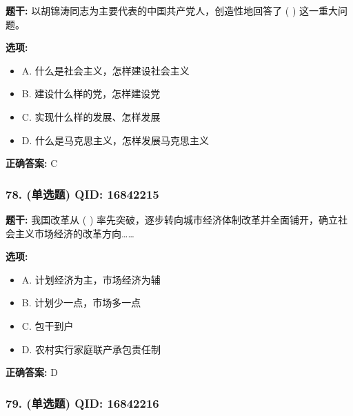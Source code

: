 \documentclass[12pt,UTF8]{ctexart}
\begin{document}
\textbf{题干:}
以胡锦涛同志为主要代表的中国共产党人，创造性地回答了 ( ) 这一重大问题。

\textbf{选项:}
\begin{itemize}[leftmargin=*]

  \item A. 什么是社会主义，怎样建设社会主义

  \item B. 建设什么样的党，怎样建设党

  \item C. 实现什么样的发展、怎样发展

  \item D. 什么是马克思主义，怎样发展马克思主义

\end{itemize}

\textbf{正确答案:}
C

\vspace{0.3em}\hrulefill\vspace{0.7em}

\subsubsection*{78. (单选题) \small QID: 16842215}

\textbf{题干:}
我国改革从 ( ) 率先突破，逐步转向城市经济体制改革并全面铺开，确立社会主义市场经济的改革方向……

\textbf{选项:}
\begin{itemize}[leftmargin=*]

  \item A. 计划经济为主，市场经济为辅

  \item B. 计划少一点，市场多一点

  \item C. 包干到户

  \item D. 农村实行家庭联产承包责任制

\end{itemize}

\textbf{正确答案:}
D

\vspace{0.3em}\hrulefill\vspace{0.7em}

\subsubsection*{79. (单选题) \small QID: 16842216}
\end{document}
